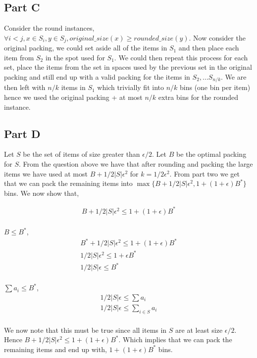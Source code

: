 \documentclass[a4paper]{article}
\begin{document}
\subsection{Part C}

Consider the round instances, $\forall i<j, x\in S_i, y \in S_j, original\_size(x) \geq rounded\_size(y)$. Now consider 
the original packing, we could set aside all of the items in $S_1$ and then place each item from 
$S_2$ in the spot used for $S_1$. We could then repeat this process for each set, place the items
from the set in spaces used by the previous set in the original packing and still end up with a valid packing for the 
items in $S_2, ...S_{n/k}$. We are then left with $n/k$ items in $S_1$ which trivially fit into $n/k$ bins (one bin 
per item) hence we used the original packing + at most $n/k$ extra bins for the rounded instance.

\subsection{Part D}
Let $S$ be the set of items of size greater than $\epsilon/2$. 
Let $B$ be the optimal packing for $S$. From the question above we have that 
after rounding and packing the large items we have used at most $B + 1/2|S|\epsilon^2$ for $k = 1/2\epsilon^2$. From part two we get that 
we can pack the remaining items into $\max\{B + 1/2|S|\epsilon^2, 1+(1+\epsilon)B^*\}$ bins. We now show that, 

\begin{align*}
	B + 1/2|S|\epsilon^2 \leq 1+(1+\epsilon)B^*\\
\end{align*}

$B \leq B^*$,
\begin{align*}
	B^* + 1/2|S|\epsilon^2 \leq 1+(1+\epsilon)B^*\\
	1/2|S|\epsilon^2 \leq 1 + \epsilon B^*\\
	1/2|S|\epsilon \leq B^*\\
\end{align*}

$\sum a_i \leq B^*$,
\begin{align*}
	1/2|S|\epsilon \leq \sum a_i\\
	1/2|S|\epsilon \leq \sum_{i\in S} a_i\\
\end{align*}

We now note that this must be true since all items in $S$ are at least size 
$\epsilon/2$. Hence $B + 1/2|S|\epsilon^2 \leq 1+(1+\epsilon)B^*$. Which implies that 
we can pack the remaining items and end up with, $1+(1+\epsilon)B^*$ bins.
\end{document}
